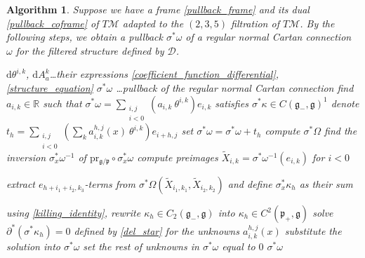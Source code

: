\documentclass{amsart}
\theoremstyle{plain}
\newtheorem{algorithm}[theorem]{Algorithm}
\theoremstyle{definition}
\theoremstyle{remark}
\newcommand{\R}{\mathbb{R}}
\newcommand{\mc}[1]{\mathcal{#1}}
\newcommand{\mfk}[1]{\mathfrak{#1}}
\newcommand{\di}{\mathrm{d}}
\begin{document}
\begin{algorithm} \label{normalization_algorithm}
    Suppose we have a frame \eqref{pullback_frame} and its dual \eqref{pullback_coframe} of $T\mc{M}$ adapted to the $(2,3,5)$ filtration of $T\mc{M}$. By the following steps, we obtain a pullback $\sigma^*\omega$ of a regular normal Cartan connection $\omega$ for the filtered structure defined by $\mc{D}$.

    \begin{algorithmic}[1]
        \algrenewcommand{}
        \algrenewcommand{}
        \Require $\di\theta^{i,k}$, $\di A_a^k$\dots their expressions \eqref{coefficient_function_differential}, \eqref{structure_equation}
        \Ensure $\sigma^*\omega$ \dots pullback of the regular normal Cartan connection
        \State find $a_{i,k}\in \R$ such that $\sigma^*\omega = \sum_{\substack{i,j \\ i<0}} \left(a_{i,k}\ \theta^{i,k} \right) e_{i,k}$ satisfies $\sigma^*\kappa \in C(\mfk{g}_-,\mfk{g})^1$
            \State denote $t_h = \sum_{\substack{i,j \\ i<0}} \left( \sum_k a_{i,k}^{h,j} (x)\ \theta^{i,k} \right) e_{i+h,j}$
            \State set $\sigma^*\omega = \sigma^*\omega + t_h$
            \State compute $\sigma^* \Omega$
            \State find the inversion $\sigma_x^*\omega^{-1}$ of $\mathrm{pr_{\mfk{g}/\mfk{p}}} \circ\sigma_x^*\omega$
            \State compute preimages $\widetilde{X}_{i,k} = \sigma^*\omega^{-1} \left(e_{i,k}\right)$ for $i<0$
            \State \parbox[t]{\linewidth-\algorithmicindent}{extract $e_{h+i_1+i_2,k_3}$-terms from $\sigma^*\Omega \left(\widetilde{X}_{i_1,k_1}, \widetilde{X}_{i_2,k_2}\right)$ and define $\sigma_x^*\kappa_h$ as their sum}
            \State using \eqref{killing_identity}, rewrite $\kappa_h \in C_2(\mfk{g}_-,\mfk{g})$ into $\kappa_h \in C^2(\mfk{p}_+,\mfk{g})$
            \State solve $\partial^*\left(\sigma^*\kappa_h\right) = 0$ defined by \eqref{del_star} for the unknowns $a_{i,k}^{h,j} (x)$
            \State substitute the solution into $\sigma^*\omega$
        \EndFor
        \State set the rest of unknowns in $\sigma^*\omega$ equal to $0$
        \State \Return $\sigma^*\omega$
    \end{algorithmic}
\end{algorithm}
\end{document}
